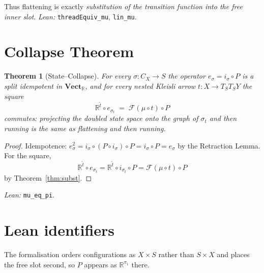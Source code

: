 \documentclass[12pt]{article}
\theoremstyle{plain}
\newtheorem{theorem}{Theorem}
\theoremstyle{remark}
\newcommand{\Vect}{\mathbf{Vect}_{\mathbb R}}
\newcommand{\RR}{\mathbb R}
\begin{document}
Thus flattening is exactly \emph{substitution of the transition function into
the free inner slot}. \emph{Lean:} \verb|threadEquiv_mu|, \verb|lin_mu|.

\bigskip
\section{Collapse Theorem}

\begin{theorem}[State--Collapse]
For every $\sigma:C_X\to S$ the operator $e_\sigma=i_\sigma\circ P$ is a split
idempotent in $\Vect$, and for every nested Kleisli arrow $t:X\to T_ST_SY$ the
square
\[
\boxed{\;\RR^{\widetilde t}\circ e_{\sigma_t}
\;=\;\mathcal F(\mu\circ t)\circ P\;}
\]
commutes: projecting the doubled state space onto the graph of $\sigma_t$ and
then running is the same as flattening and then running.
\end{theorem}

\begin{proof}
Idempotence: $e_\sigma^{2}=i_\sigma\circ(P\circ i_\sigma)\circ P
=i_\sigma\circ P=e_\sigma$ by the Retraction Lemma. For the square,
\[
\RR^{\widetilde t}\circ e_{\sigma_t}
=\RR^{\widetilde t}\circ i_{\sigma_t}\circ P
=\mathcal F(\mu\circ t)\circ P
\]
by Theorem~\ref{thm:subst}.
\end{proof}
\emph{Lean:} \verb|mu_eq_pi|.

\bigskip
\section{Lean identifiers}

The formalisation orders configurations as $X\times S$ rather than $S\times X$
and places the free slot second, so $P$ appears as $\RR^{\pi_1}$ there.
\end{document}
